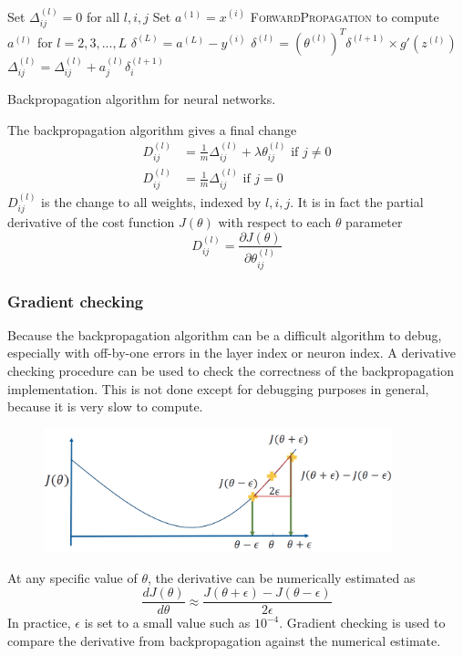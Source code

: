 \documentclass[CS5104-Notes.tex]{subfiles}
\begin{document}
\begin{algorithm}[H]
\begin{algorithmic}[1]
  \State Set $\Delta_{ij}^{(l)} = 0$ for all $l,i,j$
    \State Set $a^{(1)} = x^{(i)}$
    \State \textsc{ForwardPropagation} to compute $a^{(l)}$ for $l = 2,3,...,L$
    \State $\delta^{(L)} = a^{(L)} - y^{(i)}$
      \State $\delta^{(l)} = (\theta^{(l)})^{T}\delta^{(l+1)} \times g'(z^{(l)})$
    \EndFor
    \State $\Delta_{ij}^{(l)} = \Delta_{ij}^{(l)} + a_{j}^{(l)}\delta_{i}^{(l+1)}$
  \EndFor
\EndFor
\EndProcedure
\end{algorithmic}
\caption{Backpropagation algorithm for neural networks.}
\end{algorithm}
The backpropagation algorithm gives a final change
\begin{align}
  D_{ij}^{(l)} &= \frac{1}{m}\Delta_{ij}^{(l)} + \lambda\theta_{ij}^{(l)} \text{ if } j \neq 0 \\
  D_{ij}^{(l)} &= \frac{1}{m}\Delta_{ij}^{(l)} \text{ if } j = 0
\end{align}
$D_{ij}^{(l)}$ is the change to all weights, indexed by $l,i,j$. It is in fact the partial derivative of the cost function $J(\theta)$ with respect to each $\theta$ parameter
\begin{equation}
D_{ij}^{(l)} = \frac{\partial J(\theta)}{\partial \theta_{ij}^{(l)}}
\end{equation}

\subsubsection{Gradient checking}
Because the backpropagation algorithm can be a difficult algorithm to debug, especially with off-by-one errors in the layer index or neuron index. A derivative checking procedure can be used to check the correctness of the backpropagation implementation. This is not done except for debugging purposes in general, because it is very slow to compute.
\begin{figure}[H]
  \centering
  \includegraphics[width=0.9\textwidth, keepaspectratio]{imgs/gradient-checking.png}
\end{figure}
\noindent
At any specific value of $\theta$, the derivative can be numerically estimated as
\begin{equation}
\frac{dJ(\theta)}{d\theta} \approx \frac{J(\theta + \epsilon) - J(\theta - \epsilon)}{2\epsilon}
\end{equation}
In practice, $\epsilon$ is set to a small value such as $10^{-4}$. Gradient checking is used to compare the derivative from backpropagation against the numerical estimate. 
\end{document}
